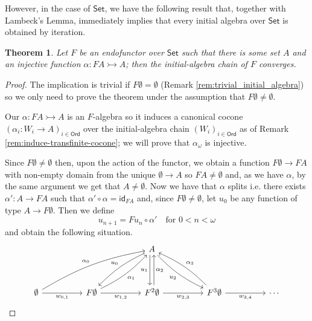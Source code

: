 \documentclass[letterpaper, 11pt, oneside]{memoir}
\theoremstyle{myteo}
\newtheorem{theorem}{Theorem}[section]
\numberwithin{equation}{section}
\newcommand{\id}{\textsf{id}}
\newcommand{\Ord}{\textsf{Ord}}
\newcommand{\Set}{\textsf{Set}}
\begin{document}
However, in the case of \(\Set\), we have the following result that, together with Lambeck's Lemma, immediately implies that every initial algebra over \(\Set\) is obtained by iteration.

\begin{theorem}
  \label{teo:set_lambeck_converse}
  Let \(F\) be an endofunctor over \(\Set\) such that there is some set \(A\) and an injective function \(\alpha : FA \rightarrowtail A\); then the initial-algebra chain of \(F\) converges.
\end{theorem}

\begin{proof}
  The implication is trivial if \(F\emptyset = \emptyset\) (Remark \ref{rem:trivial_initial_algebra}) so we only need to prove the theorem under the assumption that \(F\emptyset \neq \emptyset\).

  Our \(\alpha : FA \rightarrowtail A\) is an \(F\)-algebra so it induces a canonical cocone \((\alpha_i:W_i \to A)_{i \in \Ord}\) over the initial-algebra chain \((W_i)_{i \in \Ord}\) as of Remark \ref{rem:induce-transfinite-cocone}; we will prove that \(\alpha_\omega\) is injective.
  
  Since \(F\emptyset \neq \emptyset\) then, upon the action of the functor, we obtain a function \(F\emptyset \to FA\) with non-empty domain from the unique \(\emptyset \to A\) so \(FA \neq \emptyset\) and, as we have \(\alpha\), by the same argument we get that \(A \neq \emptyset\).
  Now we have that  \(\alpha\) splits i.e. there exists \(\alpha': A \to FA\) such that \(\alpha' \circ \alpha = \id_{FA}\) and, since \(F\emptyset \neq \emptyset\), let \(u_0\) be any function of type \(A \to F\emptyset\).
  Then we define
  \begin{equation*}
    u_{n+1} = Fu_n \circ \alpha' \quad \text{for \(0 < n < \omega\)}
  \end{equation*}
  and obtain the following situation.
  \begin{equation*}
    \begin{tikzcd}[sep=huge]
      & & A \ar[dl, bend right=10, "u_0"'] \ar[d, shift right=1, "u_1"'] \ar[dr, bend right=10, "u_2"'] & &\\
      \emptyset \ar[urr, bend left=10, "\alpha_0"] \ar[r, "w_{0,1}"'] & F\emptyset \ar[r, "w_{1,2}"'] \ar[ru, bend right=10, "\alpha_1"'] & F^2\emptyset \ar[r, "w_{2, 3}"'] \ar[u, shift right=1, "\alpha_2"'] & F^3\emptyset \ar[r, "w_{3, 4}"'] \ar[lu, bend right=10, "\alpha_3"'] & \cdots
    \end{tikzcd}
  \end{equation*}
  

\end{proof}
\end{document}
